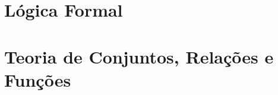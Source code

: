 \documentclass[a4paper]{book}
\theoremstyle{definition}
\begin{document}
\tableofcontents

\mainmatter



%

\part{L\'ogica Formal}






\part{Teoria de Conjuntos, Relações e Funções}




\appendix
{}



\end{document}
